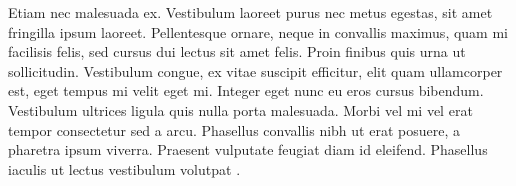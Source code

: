 \documentclass[12pt]{article}
\begin{document}
Etiam nec malesuada ex. Vestibulum laoreet purus nec metus egestas, sit amet fringilla ipsum laoreet. Pellentesque ornare, neque in convallis maximus, quam mi facilisis felis, sed cursus dui lectus sit amet felis. Proin finibus quis urna ut sollicitudin. Vestibulum congue, ex vitae suscipit efficitur, elit quam ullamcorper est, eget tempus mi velit eget mi. Integer eget nunc eu eros cursus bibendum. Vestibulum ultrices ligula quis nulla porta malesuada. Morbi vel mi vel erat tempor consectetur sed a arcu. Phasellus convallis nibh ut erat posuere, a pharetra ipsum viverra. Praesent vulputate feugiat diam id eleifend. Phasellus iaculis ut lectus vestibulum volutpat \autocite{amjad_value_2020}.

\pagebreak

\printbibliography %
\end{document}
